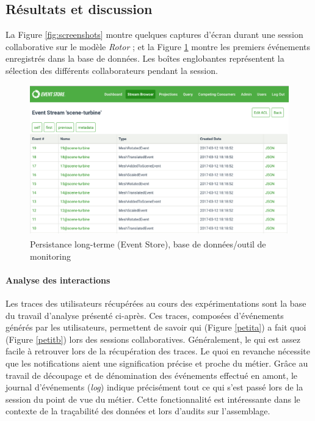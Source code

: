 \subsection{Résultats et discussion}
\label{sec:res}

La Figure \ref{fig:screenshots} montre quelques captures d'écran durant une 
session collaborative sur le modèle \textit{Rotor} ; et la Figure \ref{fig:ui4} montre les 
premiers événements enregistrés dans la base de données. 
Les boîtes englobantes représentent la sélection des différents collaborateurs 
pendant la session.

\begin{figure}[h!]
	\centering
	\includegraphics[width=\textwidth]{eps/eventstore.eps}
	\caption{Persistance long-terme (Event Store\textsuperscript{\textregistered}), 
		base de données/outil de monitoring}
	\label{fig:ui4}
\end{figure}


\paragraph{Analyse des interactions}
Les traces des utilisateurs récupérées au cours des expérimentations sont la base 
du travail d'analyse présenté ci-après. Ces traces, composées d'événements 
générés par les utilisateurs, permettent de savoir qui (Figure \ref{petita}) a fait quoi 
(Figure \ref{petitb}) lors des sessions collaboratives. Généralement, le \og qui\fg{} 
est assez facile à retrouver lors de la récupération des traces. Le \og quoi\fg{} 
en revanche nécessite que les notifications aient une signification précise et proche 
du métier. Grâce au travail de découpage et de dénomination des événements 
effectué en amont, le journal d'événements (\textit{log}) indique précisément tout 
ce qui s'est passé lors de la session du point de vue du métier. Cette 
fonctionnalité est intéressante dans le contexte de la traçabilité des données et 
lors d'audits sur l'assemblage. 

